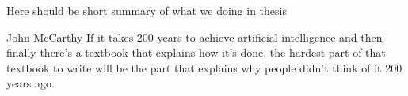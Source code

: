 Here should be short summary of what we doing in thesis

\begin{bigquote}{John McCarthy}
    If it takes 200 years to achieve artificial intelligence and then finally there's a textbook that explains how it's done, the hardest part of that textbook to write will be the part that explains why people didn't think of it 200 years ago.
\end{bigquote}

